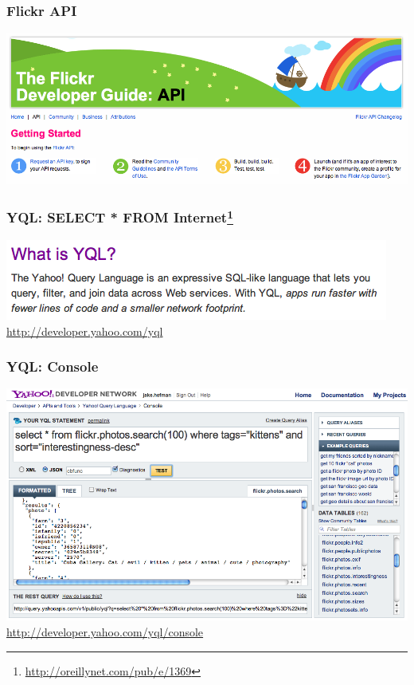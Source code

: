 \begin{frame}
  \frametitle{Flickr API}

  \begin{center}
    \includegraphics[width=\textwidth]{flickr_api.png}
  \end{center}

\end{frame}


\begin{frame}
  \frametitle{YQL: SELECT * FROM Internet\footnote{\url{http://oreillynet.com/pub/e/1369}}}

  \begin{center}

    \includegraphics[width=\textwidth]{what_is_yql.png}
    \url{http://developer.yahoo.com/yql}

  \end{center}

\end{frame}


\begin{frame}
  \frametitle{YQL: Console}

  \begin{center}
    \includegraphics[width=\textwidth]{yql_console.png}
    \url{http://developer.yahoo.com/yql/console}
  \end{center}

\end{frame}


